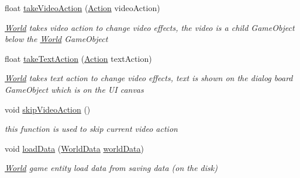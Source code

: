 \begin{DoxyCompactItemize}
float \hyperlink{classdoki_unity_1_1_world_a01567311405596f880cb123a145b0afa}{take\+Video\+Action} (\hyperlink{classdoki_script_setting_1_1_action}{Action} video\+Action)
\begin{DoxyCompactList}\small\item\em \hyperlink{classdoki_unity_1_1_world}{World} takes video action to change video effects, the video is a child Game\+Object below the \hyperlink{classdoki_unity_1_1_world}{World} Game\+Object \end{DoxyCompactList}\item 
float \hyperlink{classdoki_unity_1_1_world_ac54321ab1f66277f8b69c4f1fb065b19}{take\+Text\+Action} (\hyperlink{classdoki_script_setting_1_1_action}{Action} text\+Action)
\begin{DoxyCompactList}\small\item\em \hyperlink{classdoki_unity_1_1_world}{World} takes text action to change video effects, text is shown on the dialog board Game\+Object which is on the UI canvas \end{DoxyCompactList}\item 
void \hyperlink{classdoki_unity_1_1_world_a014e87e0f64929f3a7cdc925d552f40a}{skip\+Video\+Action} ()
\begin{DoxyCompactList}\small\item\em this function is used to skip current video action \end{DoxyCompactList}\item 
void \hyperlink{classdoki_unity_1_1_world_a43c694c202bb44d60db104ff6e8a68b8}{load\+Data} (\hyperlink{classdoki_unity_1_1_world_data}{World\+Data} \hyperlink{classdoki_unity_1_1_world_a3e521b89596af805bc18166709368d7e}{world\+Data})
\begin{DoxyCompactList}\small\item\em \hyperlink{classdoki_unity_1_1_world}{World} game entity load data from saving data (on the disk) \end{DoxyCompactList}\end{DoxyCompactItemize}
